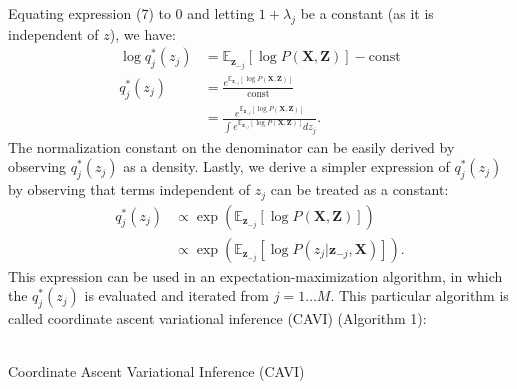 \documentclass[a4paper,12pt]{article}
\numberwithin{equation}{section}
\begin{document}
Equating expression (7) to 0 and letting $1+\lambda_j$ be a constant (as it is independent of $z$), we have:
\begin{align*}
\log q_j^*(z_j)&= \mathbb{E}_{\textbf{z}_{-j}}[\log P(\textbf{X},\textbf{Z})]-\text{const}\\
q_j^*(z_j)&=\frac{e^{\mathbb{E}_{\textbf{z}_{-j}}[\log P(\textbf{X},\textbf{Z})]}}{\text{const}}\\
&= \frac{e^{\mathbb{E}_{\textbf{z}_{-j}}[\log P(\textbf{X},\textbf{Z})]}}{\int e^{\mathbb{E}_{\textbf{z}_{-j}}[\log P(\textbf{X},\textbf{Z})]}dz_j}.
\end{align*}
The normalization constant on the denominator can be easily derived by observing $q^*_j(z_j)$ as a density. Lastly, we derive a simpler expression of $q^*_j(z_j)$ by observing that terms independent of $z_j$ can be treated as a constant:
\begin{align}
q^*_j(z_j)&\propto \exp\left(\mathbb{E}_{\textbf{z}_{-j}}[\log P(\textbf{X},\textbf{Z})]\right)\nonumber\\
&\propto \exp\left(\mathbb{E}_{\textbf{z}_{-j}}[\log P(z_j|\textbf{z}_{-j},\textbf{X})]\right).
\end{align}
This expression can be used in an expectation-maximization algorithm, in which the $q^*_j(z_j)$ is evaluated and iterated from $j=1\dots M$. This particular algorithm is called coordinate ascent variational inference (CAVI) (Algorithm 1):\\
\\
\begin{algorithm}[H]
\caption{Coordinate Ascent Variational Inference (CAVI)}
\BlankLine
{}
\end{algorithm}
\end{document}
